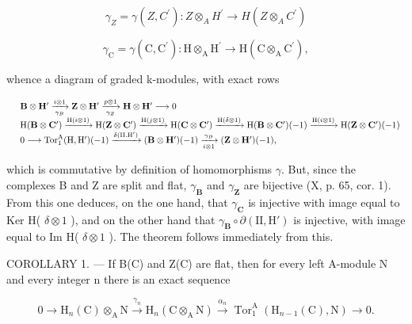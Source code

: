 \[
\gamma_ {Z} = \gamma (Z, C ^ {\prime}): Z \otimes_ {A} H ^ {\prime} \rightarrow H (Z \otimes_ {A} C ^ {\prime})
\]

\[
\gamma_ {\mathrm{C}} = \gamma (\mathrm{C}, \mathrm{C} ^ {\prime}): \mathrm{H} \otimes_ {\mathrm{A}} \mathrm{H} ^ {\prime} \rightarrow \mathrm{H} (\mathrm{C} \otimes_ {\mathrm{A}} \mathrm{C} ^ {\prime}),
\]

whence a diagram of graded k-modules, with exact rows

\[
\begin{array}{r l} & \mathbf {B} \otimes \mathbf {H} ^ {\prime} \xrightarrow [ \gamma_ {B} ]{i \otimes 1} \mathbf {Z} \otimes \mathbf {H} ^ {\prime} \xrightarrow [ \gamma_ {Z} ]{p \otimes 1} \mathbf {H} \otimes \mathbf {H} ^ {\prime} \longrightarrow 0 \\ & \mathrm{H} (\mathbf {B} \otimes \mathbf {C} ^ {\prime}) \xrightarrow {\mathrm{H} (i \otimes 1)} \mathrm{H} (\mathbf {Z} \otimes \mathbf {C} ^ {\prime}) \xrightarrow {\mathrm{H} (j \otimes 1)} \mathrm{H} (\mathbf {C} \otimes \mathbf {C} ^ {\prime}) \xrightarrow {\mathrm{H} (\delta \otimes 1)} \mathrm{H} (\mathbf {B} \otimes \mathbf {C} ^ {\prime}) (- 1) \xrightarrow {\mathrm{H} (i \otimes 1)} \mathrm{H} (\mathbf {Z} \otimes \mathbf {C} ^ {\prime}) (- 1) \\ & 0 \longrightarrow \operatorname{Tor} _ {1} ^ {\mathrm{A}} (\mathrm{H}, \mathrm{H} ^ {\prime}) (- 1) \xrightarrow {\delta (\mathrm{II.H} ^ {\prime})} (\mathbf {B} \otimes \mathbf {H} ^ {\prime}) (- 1) \xrightarrow [ i \otimes 1 ]{\gamma_ {B}} (\mathbf {Z} \otimes \mathbf {H} ^ {\prime}) (- 1), \end{array}
\]

which is commutative by definition of homomorphisms \(\gamma\). But, since the complexes B and Z are split and flat, \(\gamma_{\mathbf{B}}\) and \(\gamma_{\mathbf{Z}}\) are bijective (X, p. 65, cor. 1). From this one deduces, on the one hand, that \(\gamma_{\mathbf{C}}\) is injective with image equal to Ker H( \(\delta \otimes 1\) ), and on the other hand that \(\gamma_{\mathbf{B}} \circ \partial(\mathrm{II}, \mathrm{H}')\) is injective, with image equal to Im H( \(\delta \otimes 1\) ). The theorem follows immediately from this.

COROLLARY 1. --- If B(C) and Z(C) are flat, then for every left A-module N and every integer n there is an exact sequence

\[
0 \longrightarrow \mathrm{H} _ {n} (\mathrm{C}) \otimes_ {\mathrm{A}} \mathrm{N} \xrightarrow {\gamma_ {n}} \mathrm{H} _ {n} (\mathrm{C} \otimes_ {\mathrm{A}} \mathrm{N}) \xrightarrow {\alpha_ {n}} \operatorname{Tor} _ {1} ^ {\mathrm{A}} \left(\mathrm{H} _ {n - 1} (\mathrm{C}), \mathrm{N}\right) \longrightarrow 0.\tag{13}
\]

